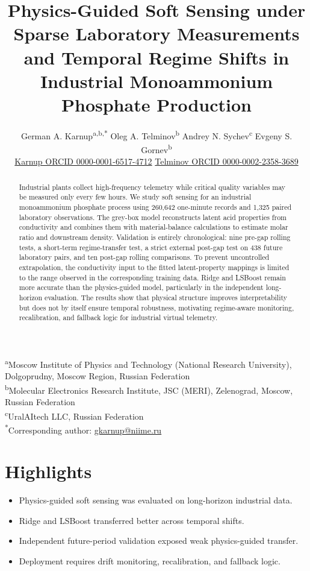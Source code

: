 \documentclass[11pt]{article}
\title{\textbf{Physics-Guided Soft Sensing under Sparse Laboratory Measurements and Temporal Regime Shifts in Industrial Monoammonium Phosphate Production}}
\author{%
German A. Karnup\textsuperscript{a,b,*}\quad
Oleg A. Telminov\textsuperscript{b}\quad
Andrey N. Sychev\textsuperscript{c}\quad
Evgeny S. Gornev\textsuperscript{b}\\[0.35em]
\small
\href{https://orcid.org/0000-0001-6517-4712}{Karnup ORCID 0000-0001-6517-4712}\quad
\href{https://orcid.org/0000-0002-2358-3689}{Telminov ORCID 0000-0002-2358-3689}
}
\date{}
\begin{document}
\maketitle

\begin{center}
\small
\textsuperscript{a}Moscow Institute of Physics and Technology (National Research University), Dolgoprudny, Moscow Region, Russian Federation\\
\textsuperscript{b}Molecular Electronics Research Institute, JSC (MERI), Zelenograd, Moscow, Russian Federation\\
\textsuperscript{c}UralAItech LLC, Russian Federation\\
\textsuperscript{*}Corresponding author: \href{mailto:gkarnup@niime.ru}{gkarnup@niime.ru}
\end{center}

\section*{Highlights}
\begin{itemize}[leftmargin=1.5em]
\item Physics-guided soft sensing was evaluated on long-horizon industrial data.
\item Ridge and LSBoost transferred better across temporal shifts.
\item Independent future-period validation exposed weak physics-guided transfer.
\item Deployment requires drift monitoring, recalibration, and fallback logic.
\end{itemize}

\begin{abstract}
Industrial plants collect high-frequency telemetry while critical quality variables may be measured only every few hours. We study soft sensing for an industrial monoammonium phosphate process using 260,642 one-minute records and 1,325 paired laboratory observations. The grey-box model reconstructs latent acid properties from conductivity and combines them with material-balance calculations to estimate molar ratio and downstream density. Validation is entirely chronological: nine pre-gap rolling tests, a short-term regime-transfer test, a strict external post-gap test on 438 future laboratory pairs, and ten post-gap rolling comparisons. To prevent uncontrolled extrapolation, the conductivity input to the fitted latent-property mappings is limited to the range observed in the corresponding training data. Ridge and LSBoost remain more accurate than the physics-guided model, particularly in the independent long-horizon evaluation. The results show that physical structure improves interpretability but does not by itself ensure temporal robustness, motivating regime-aware monitoring, recalibration, and fallback logic for industrial virtual telemetry.
\end{abstract}
\end{document}
